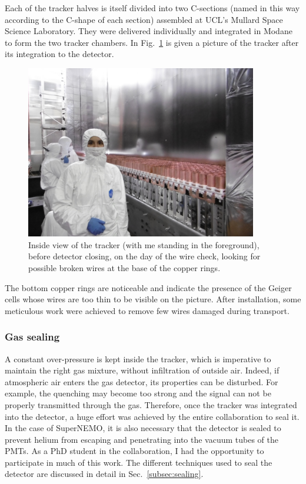 Each of the tracker halves is itself divided into two C-sections (named in this way according to the C-shape of each section) assembled at UCL’s Mullard Space Science Laboratory.
They were delivered individually and integrated in Modane to form the two tracker chambers.
In Fig.~\ref{fig:me_tracker} is given a picture of the tracker after its integration to the detector.
\begin{figure}[h!]
\centering
\includegraphics[width=0.9\textwidth]{SNdemonstrator/fig_SNdemonstrator/tracker_selfie.jpg}
\caption{Inside view of the tracker (with me standing in the foreground), before detector closing, on the day of the wire check, looking for possible broken wires at the base of the copper rings.
\label{fig:me_tracker}}
\end{figure}
The bottom copper rings are noticeable and indicate the presence of the Geiger cells whose wires are too thin to be visible on the picture.
After installation, some meticulous work were achieved to remove few wires damaged during transport.

\subsubsection*{Gas sealing}

A constant over-pressure is kept inside the tracker, which is imperative to maintain the right gas mixture, without infiltration of outside air.
Indeed, if atmospheric air enters the gas detector, its properties can be disturbed.
For example, the quenching may become too strong and the signal can not be properly transmitted through the gas.
Therefore, once the tracker was integrated into the detector, a huge effort was achieved by the entire collaboration to seal it.
In the case of SuperNEMO, it is also necessary that the detector is sealed to prevent helium from escaping and penetrating into the vacuum tubes of the PMTs.
As a PhD student in the collaboration, I had the opportunity to participate in much of this work.
The different techniques used to seal the detector are discussed in detail in Sec.~\ref{subsec:sealing}.

